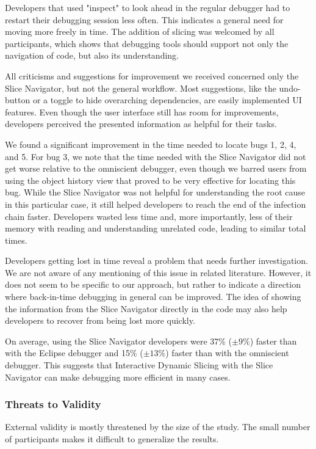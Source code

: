 Developers that used "inspect" to look ahead in the regular debugger had to restart their debugging session less often.
This indicates a general need for moving more freely in time.
The addition of slicing was welcomed by all participants, which shows that debugging tools should support not only the navigation of code, but also its understanding.

All criticisms and suggestions for improvement we received concerned only the Slice Navigator, but not the general workflow.
Most suggestions, like the undo-button or a toggle to hide overarching dependencies, are easily implemented UI features.
Even though the user interface still has room for improvements, developers perceived the presented information as helpful for their tasks.

We found a significant improvement in the time needed to locate bugs 1, 2, 4, and 5.
For bug 3, we note that the time needed with the Slice Navigator did not get worse relative to the omniscient debugger, even though we barred users from using the object history view that proved to be very effective for locating this bug.
While the Slice Navigator was not helpful for understanding the root cause in this particular case, it still helped developers to reach the end of the infection chain faster.
Developers wasted less time and, more importantly, less of their memory with reading and understanding unrelated code, leading to similar total times.

Developers getting lost in time reveal a problem that needs further investigation. 
We are not aware of any mentioning of this issue in related literature.
However, it does not seem to be specific to our approach, but rather to indicate a direction where back-in-time debugging in general can be improved.
The idea of showing the information from the Slice Navigator directly in the code may also help developers to recover from being lost more quickly.

On average, using the Slice Navigator developers were 37\% ($\pm9\%$) faster than with the Eclipse debugger and 15\% ($\pm13\%$) faster than with the omniscient debugger.
This suggests that Interactive Dynamic Slicing with the Slice Navigator can make debugging more efficient in many cases.

\subsubsection{Threats to Validity}

External validity is mostly threatened by the size of the study. 
The small number of participants makes it difficult to generalize the results.

